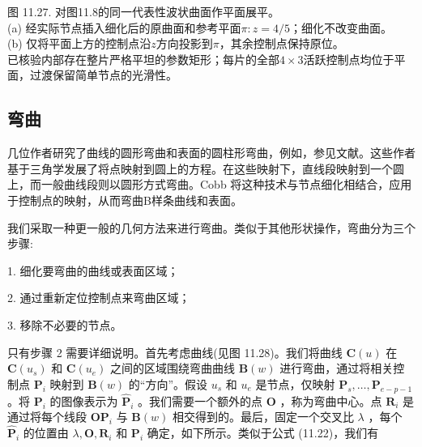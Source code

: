 \documentclass[../main.tex]{subfiles}
\begin{document}
\begin{center}
\begin{minipage}{37cm}
\centering
{}
\par\smallskip
图 11.27. 对图11.8的同一代表性波状曲面作平面展平。\\
(a) 经实际节点插入细化后的原曲面和参考平面$\pi:z=4/5$；细化不改变曲面。\\
(b) 仅将平面上方的控制点沿$z$方向投影到$\pi$，其余控制点保持原位。\\
已核验内部存在整片严格平坦的参数矩形；每片的全部$4\times3$活跃控制点均位于平面，过渡保留简单节点的光滑性。
\end{minipage}
\end{center}

\subsection{弯曲}

几位作者研究了曲线的圆形弯曲和表面的圆柱形弯曲，例如，参见文献\cite{Barr83,Four83,Cobb84}。这些作者基于三角学发展了将点映射到圆上的方程。在这些映射下，直线段映射到一个圆上，而一般曲线段则以圆形方式弯曲。Cobb \cite{Cobb84}将这种技术与节点细化相结合，应用于控制点的映射，从而弯曲B样条曲线和表面。

我们采取一种更一般的几何方法来进行弯曲。类似于其他形状操作，弯曲分为三个步骤:

1. 细化要弯曲的曲线或表面区域；

2. 通过重新定位控制点来弯曲区域；

3. 移除不必要的节点。

只有步骤 2 需要详细说明。首先考虑曲线(见图 11.28)。我们将曲线 \(\mathbf{C}\left( u\right)\) 在 \(\mathbf{C}\left( {u}_{s}\right)\) 和 \(\mathbf{C}\left( {u}_{e}\right)\) 之间的区域围绕弯曲曲线 \(\mathbf{B}\left( w\right)\) 进行弯曲，通过将相关控制点 \({\mathbf{P}}_{i}\) 映射到 \(\mathbf{B}\left( w\right)\) 的“方向”。假设 \({u}_{s}\) 和 \({u}_{e}\) 是节点，仅映射 \({\mathbf{P}}_{s},\ldots ,{\mathbf{P}}_{e - p - 1}\) 。将 \({\mathbf{P}}_{i}\) 的图像表示为 \({\widehat{\mathbf{P}}}_{i}\) 。我们需要一个额外的点 \(\mathbf{O}\) ，称为弯曲中心。点 \({\mathbf{R}}_{i}\) 是通过将每个线段 \({\mathbf{{OP}}}_{i}\) 与 \(\mathbf{B}\left( w\right)\) 相交得到的。最后，固定一个交叉比 \(\lambda\) ，每个 \({\widehat{\mathbf{P}}}_{i}\) 的位置由 \(\lambda ,\mathbf{O},{\mathbf{R}}_{i}\) 和 \({\mathbf{P}}_{i}\) 确定，如下所示。类似于公式 (11.22)，我们有
\end{document}
